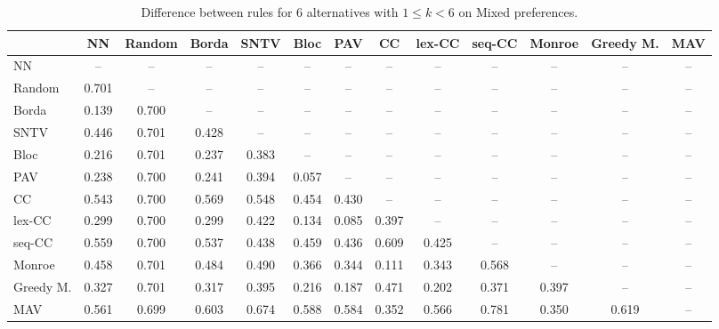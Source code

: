 
\begin{table*}[htbp]
\centering
\begin{tabular}{lcccccccccccc}
\toprule
 & NN & Random & Borda & SNTV & Bloc & PAV & CC & lex-CC & seq-CC & Monroe & Greedy M. & MAV \\
\midrule
NN & -- & -- & -- & -- & -- & -- & -- & -- & -- & -- & -- & -- \\
Random & \cellcolor{blue!70} 0.701 & -- & -- & -- & -- & -- & -- & -- & -- & -- & -- & -- \\
Borda & \cellcolor{blue!13} 0.139 & \cellcolor{blue!70} 0.700 & -- & -- & -- & -- & -- & -- & -- & -- & -- & -- \\
SNTV & \cellcolor{blue!44} 0.446 & \cellcolor{blue!70} 0.701 & \cellcolor{blue!42} 0.428 & -- & -- & -- & -- & -- & -- & -- & -- & -- \\
Bloc & \cellcolor{blue!21} 0.216 & \cellcolor{blue!70} 0.701 & \cellcolor{blue!23} 0.237 & \cellcolor{blue!38} 0.383 & -- & -- & -- & -- & -- & -- & -- & -- \\
PAV & \cellcolor{blue!23} 0.238 & \cellcolor{blue!70} 0.700 & \cellcolor{blue!24} 0.241 & \cellcolor{blue!39} 0.394 & \cellcolor{blue!5} 0.057 & -- & -- & -- & -- & -- & -- & -- \\
CC & \cellcolor{blue!54} 0.543 & \cellcolor{blue!70} 0.700 & \cellcolor{blue!56} 0.569 & \cellcolor{blue!54} 0.548 & \cellcolor{blue!45} 0.454 & \cellcolor{blue!43} 0.430 & -- & -- & -- & -- & -- & -- \\
lex-CC & \cellcolor{blue!29} 0.299 & \cellcolor{blue!70} 0.700 & \cellcolor{blue!29} 0.299 & \cellcolor{blue!42} 0.422 & \cellcolor{blue!13} 0.134 & \cellcolor{blue!8} 0.085 & \cellcolor{blue!39} 0.397 & -- & -- & -- & -- & -- \\
seq-CC & \cellcolor{blue!55} 0.559 & \cellcolor{blue!70} 0.700 & \cellcolor{blue!53} 0.537 & \cellcolor{blue!43} 0.438 & \cellcolor{blue!45} 0.459 & \cellcolor{blue!43} 0.436 & \cellcolor{blue!60} 0.609 & \cellcolor{blue!42} 0.425 & -- & -- & -- & -- \\
Monroe & \cellcolor{blue!45} 0.458 & \cellcolor{blue!70} 0.701 & \cellcolor{blue!48} 0.484 & \cellcolor{blue!49} 0.490 & \cellcolor{blue!36} 0.366 & \cellcolor{blue!34} 0.344 & \cellcolor{blue!11} 0.111 & \cellcolor{blue!34} 0.343 & \cellcolor{blue!56} 0.568 & -- & -- & -- \\
Greedy M. & \cellcolor{blue!32} 0.327 & \cellcolor{blue!70} 0.701 & \cellcolor{blue!31} 0.317 & \cellcolor{blue!39} 0.395 & \cellcolor{blue!21} 0.216 & \cellcolor{blue!18} 0.187 & \cellcolor{blue!47} 0.471 & \cellcolor{blue!20} 0.202 & \cellcolor{blue!37} 0.371 & \cellcolor{blue!39} 0.397 & -- & -- \\
MAV & \cellcolor{blue!56} 0.561 & \cellcolor{blue!69} 0.699 & \cellcolor{blue!60} 0.603 & \cellcolor{blue!67} 0.674 & \cellcolor{blue!58} 0.588 & \cellcolor{blue!58} 0.584 & \cellcolor{blue!35} 0.352 & \cellcolor{blue!56} 0.566 & \cellcolor{blue!78} 0.781 & \cellcolor{blue!35} 0.350 & \cellcolor{blue!61} 0.619 & -- \\
\bottomrule
\end{tabular}

\caption{Difference between rules for 6 alternatives with $1 \leq k < 6$ on Mixed preferences.}
\label{tab:rule_distance_heatmap-m=[6]-pref_dist=mixed}
\end{table*}
    